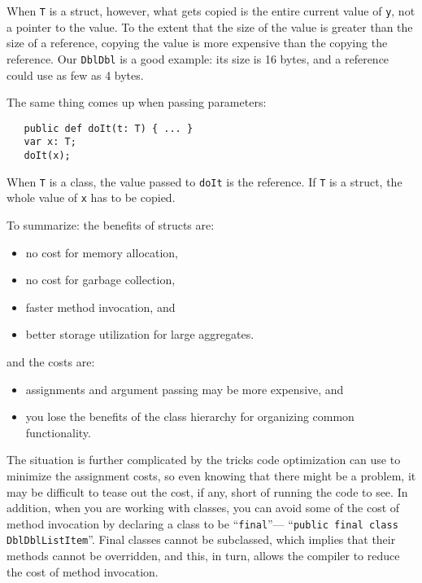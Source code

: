 When {\tt T} is a struct, however, what gets copied
is the entire current value of {\tt y}, not a pointer to the value.  To the
extent that the  size of the value is greater than the size of a reference,
copying the value is more expensive than the copying the reference.
Our {\tt DblDbl} is a good example: its size is 16 bytes, and a reference
could use as few as 4 bytes.

The same thing comes up when passing parameters:
\begin{verbatim}
   public def doIt(t: T) { ... }
   var x: T;
   doIt(x);
\end{verbatim}
When {\tt T} is a class, the value passed to {\tt doIt} is the reference.  If
{\tt T} is a struct, the whole value of {\tt x} has to be copied.
 
To summarize: the benefits of structs are:
\begin{itemize}
\item  no cost for memory allocation,
\item  no cost for garbage collection,
\item  faster method invocation, and
\item  better storage utilization for large aggregates.
\end{itemize}
and the costs are:

\begin{itemize}
\item  assignments and argument passing may be more expensive, and
\item  you lose the benefits of the class hierarchy for organizing common
functionality.
\end{itemize}

The situation is further complicated by the tricks code optimization can use to
minimize the assignment costs, so even knowing that there might be a problem, it
may be difficult to tease out the cost, if any, short of running the code to
see. In addition, when you are working with classes, you can avoid some of the
cost of method invocation by declaring a class to be ``{\tt final}''---\eg{}
``{\tt public final class DblDblListItem}''.  Final classes cannot be
subclassed, which implies that their methods cannot be overridden, and this, in
turn, allows the compiler to reduce the cost of method invocation.
